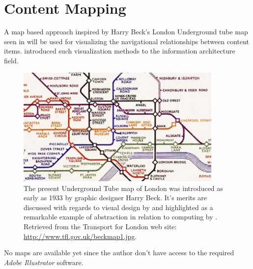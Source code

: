 \chapter{Content Mapping}

\label{appendix:content.mapping}

A map based approach inspired by Harry Beck's London Underground tube
map seen in 
will be used for visualizing the navigational relationships between content
items. \citet{walsh07} introduced such visualization methods to the
information architecture field.

\begin{figure}[htb]
  \centering
  \strictpagechecktrue
  \includegraphics[width=0.9\textwidth]{beck_1933_map}
  \caption[1933 London Underground Tube map]{%
    The present Underground Tube map of London was introduced as early as
    1933 by graphic designer Harry Beck. It's merits are discussed
    with regards to visual design by \citet{hadlaw03} and highlighted as
    a remarkable example of abstraction in relation to computing by
    \citet{kramer07}. Retrieved from the Transport for London web site:
    \url{http://www.tfl.gov.uk/beckmap1.jpg}.}
  \label{figure:beck.1933.map}
\end{figure}

No maps are available yet since the author don't have access to the required
\emph{Adobe Illustrator} software.
